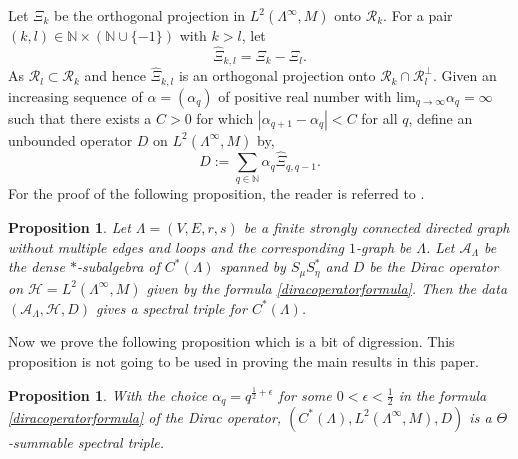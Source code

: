 \documentclass{amsart}
\theoremstyle{plain}
\newtheorem{proposition}[subsection]{Proposition}
\theoremstyle{definition}
\theoremstyle{remark}
\numberwithin{equation}{section}
\newcommand{\raro}{\rightarrow}
\begin{document}
Let $\Xi_{k}$ be the orthogonal projection in $L^{2}(\Lambda^{\infty},M)$ onto $\mathcal{R}_{k}$. For a pair $(k,l)\in \mathbb{N}\times (\mathbb{N}\cup \{-1\})$ with $k>l$, let 
\begin{equation*}
    \widehat{\Xi}_{k,l}=\Xi_{k}-\Xi_{l}.
\end{equation*}
As $\mathcal{R}_{l}\subset \mathcal{R}_{k}$ and hence $\widehat{\Xi}_{k,l}$ is an orthogonal projection onto $\mathcal{R}_{k}\cap \mathcal{R}_{l}^{\bot}$.
Given an increasing sequence of $\alpha=(\alpha_{q})$ of positive real number with $\text{lim}_{q\raro \infty}\alpha_{q}=\infty$ such that there exists a $C>0$ for which $|\alpha_{q+1}-\alpha_{q}|<C$ for all $q$, define an unbounded operator $D$ on $L^{2}(\Lambda^{\infty},M)$ by, 
\begin{equation}
\label{diracoperatorformula}
    D:= \sum\limits_{q\in \mathbb{N}}\alpha_{q}\widehat{\Xi}_{q,q-1}. 
\end{equation}
For the proof of the following proposition, the reader is referred to \cite{farsi}.
\begin{proposition}
\label{spectral triple}
    Let $\Lambda=(V,E,r,s)$ be a finite strongly connected directed graph without multiple edges and loops and the corresponding $1$-graph be $\Lambda$. Let $\mathcal{A}_{\Lambda}$ be the dense $\ast$-subalgebra of $C^{\ast}(\Lambda)$ spanned by $S_{\mu}S_{\eta}^{\ast}$ and $D$ be the Dirac operator on $\mathcal{H}=L^{2}(\Lambda^{\infty},M)$ given by the formula \ref{diracoperatorformula}. Then the data $(\mathcal{A}_{\Lambda}, \mathcal{H}, D)$ gives a spectral triple for $C^{\ast}(\Lambda)$.
\end{proposition}
Now we prove the following proposition which is a bit of digression. This proposition is not going to be used in proving the main results in this paper.
\begin{proposition}
    With the choice $\alpha_{q}=q^{\frac{1}{2}+\epsilon}$ for some $0<\epsilon<\frac{1}{2}$ in the formula \ref{diracoperatorformula} of the Dirac operator, $(C^{\ast}(\Lambda),L^{2}(\Lambda^{\infty},M),D)$ is a $\Theta$-summable spectral triple.
\end{proposition}
\end{document}
